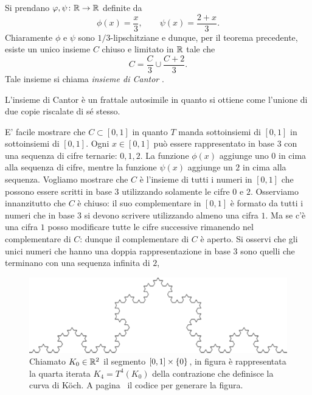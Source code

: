 \begin{example}
  \label{ex:insieme_Cantor}%
Si prendano $\varphi, \psi\colon {\mathbb R} \to {\mathbb R}$ definite da
\[
  \phi(x) = \frac{x}{3}, \qquad
  \psi(x) = \frac{2+x}{3}.
\]
Chiaramente $\phi$ e $\psi$ sono $1/3$-lipschitziane e dunque, per il teorema precedente, esiste un unico insieme $C$ chiuso e limitato in ${\mathbb R}$ tale che
\[
  C = \frac{C}{3} \cup \frac{C+2}{3}.
\]
Tale insieme si chiama \emph{insieme di Cantor}%
.

L'insieme di Cantor è un frattale autosimile in quanto si ottiene come l'unione di due copie riscalate di sé stesso.

E' facile mostrare che $C\subset [0,1]$ in quanto $T$ manda sottoinsiemi di $[0,1]$ in sottoinsiemi di $[0,1]$.
Ogni $x\in [0,1]$ può essere rappresentato in base $3$ con una sequenza di cifre ternarie: $0,1,2$. La funzione $\phi(x)$ aggiunge uno $0$ in cima alla sequenza di cifre, mentre la funzione $\psi(x)$ aggiunge un $2$ in cima alla sequenza.
Vogliamo mostrare che $C$ è l'insieme di tutti i numeri in $[0,1]$ che possono essere scritti in base $3$ utilizzando solamente le cifre $0$ e $2$. Osserviamo innanzitutto che $C$ è chiuso: il suo complementare in $[0,1]$ è formato da tutti i numeri che in base $3$ si devono scrivere utilizzando almeno una cifra $1$. Ma se c'è una cifra $1$ posso modificare tutte le cifre successive rimanendo nel complementare di $C$: dunque il complementare di $C$ è aperto. Si osservi che gli unici numeri che hanno una doppia rappresentazione in base $3$ sono quelli che terminano con una sequenza infinita di $2$,
\end{example}

\begin{figure}
\centering\includegraphics[width=1.0\textwidth]{koch_picture}
\caption{
Chiamato $K_0 \in {\mathbb R}^2$ il segmento $[0,1]\times {\left\{ 0 \right\}}$,
in figura è rappresentata
la quarta iterata $K_4 = T^4(K_0)$ della contrazione che definisce la curva di K{\"o}ch.
A pagina~\pageref{code:Koch} il codice per generare la figura.
%
}
\label{fig:koch}
\end{figure}

